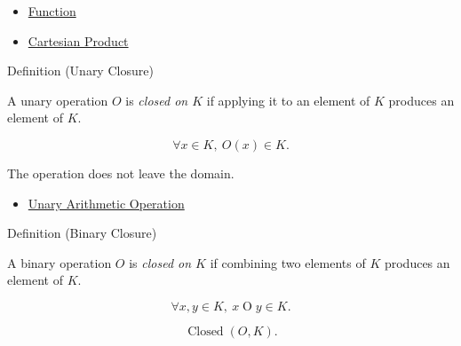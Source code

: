 \begin{dependencies}
\begin{itemize}
  \item \hyperref[def:function]{Function}
  \item \hyperref[def:cartesian-product-rel]{Cartesian Product}
\end{itemize}
\end{dependencies}

\begin{definitionbox}{Definition (Unary Closure)}
\begin{definition}
\label{def:unary-closure}
A unary operation $O$ is \emph{closed on $K$} if applying it to an element of
$K$ produces an element of $K$.
\end{definition}
\end{definitionbox}

\begin{remark*}
\[
\forall x\in K,\ O(x)\in K.
\]
\end{remark*}

\begin{remark*}[Interpretation]
The operation does not leave the domain.
\end{remark*}

\begin{dependencies}
\begin{itemize}
  \item \hyperref[def:unary-arithmetic-operation]{Unary Arithmetic Operation}
\end{itemize}
\end{dependencies}

\begin{definitionbox}{Definition (Binary Closure)}
\begin{definition}
\label{def:binary-closure}
A binary operation $O$ is \emph{closed on $K$} if combining two elements of
$K$ produces an element of $K$.
\end{definition}
\end{definitionbox}

\begin{remark*}
\[
\forall x,y\in K,\ x\mathbin{O}y\in K.
\]
\end{remark*}

\begin{remark*}
\[
\operatorname{Closed}(O,K).
\]
\end{remark*}

